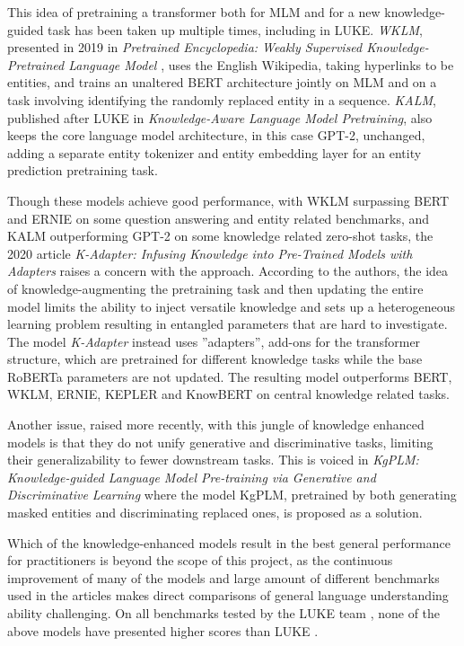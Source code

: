 \documentclass[main.tex]{subfiles}
\begin{document}
This idea of pretraining a transformer both for MLM and for a new knowledge-guided task has been taken up multiple times, including in LUKE.
\emph{WKLM}, presented in 2019 in \emph{Pretrained Encyclopedia: Weakly Supervised Knowledge-Pretrained Language Model} \cite{xiong2019wklm}, uses the English Wikipedia, taking hyperlinks to be entities, and trains an unaltered BERT architecture jointly on MLM and on a task involving identifying the randomly replaced entity in a sequence.
\emph{KALM}, published after LUKE in \emph{Knowledge-Aware Language Model Pretraining}, also keeps the core language model architecture, in this case GPT-2, unchanged, adding a separate entity tokenizer and entity embedding layer for an entity prediction pretraining task.

Though these models achieve good performance, with WKLM surpassing BERT and ERNIE on some question answering and entity related benchmarks, and KALM outperforming GPT-2 on some knowledge related zero-shot tasks, the 2020 article \emph{K-Adapter: Infusing Knowledge into Pre-Trained Models with Adapters} \cite{wang2020kadapter} raises a concern with the approach.
According to the authors, the idea of knowledge-augmenting the pretraining task and then updating the entire model limits the ability to inject versatile knowledge and sets up a heterogeneous learning problem resulting in entangled parameters that are hard to investigate.
The model \emph{K-Adapter} instead uses ''adapters'', add-ons for the transformer structure, which are pretrained for different knowledge tasks while the base RoBERTa parameters are not updated.
The resulting model outperforms BERT, WKLM, ERNIE, KEPLER and KnowBERT on central knowledge related tasks.

Another issue, raised more recently, with this jungle of knowledge enhanced models is that they do not unify generative and discriminative tasks, limiting their generalizability to fewer downstream tasks.
This is voiced in \emph{KgPLM: Knowledge-guided Language Model Pre-training via Generative and Discriminative Learning} \cite{he2020kgplm} where the model KgPLM, pretrained by both generating masked entities and discriminating replaced ones, is proposed as a solution.

Which of the knowledge-enhanced models result in the best general performance for practitioners is beyond the scope of this project, as the continuous improvement of many of the models and large amount of different benchmarks used in the articles makes direct comparisons of general language understanding ability challenging.
On all benchmarks tested by the LUKE team \cite{yamada2020luke}, none of the above models have presented higher scores than LUKE \cite[Sec. 4]{yamada2020luke}.
\end{document}
